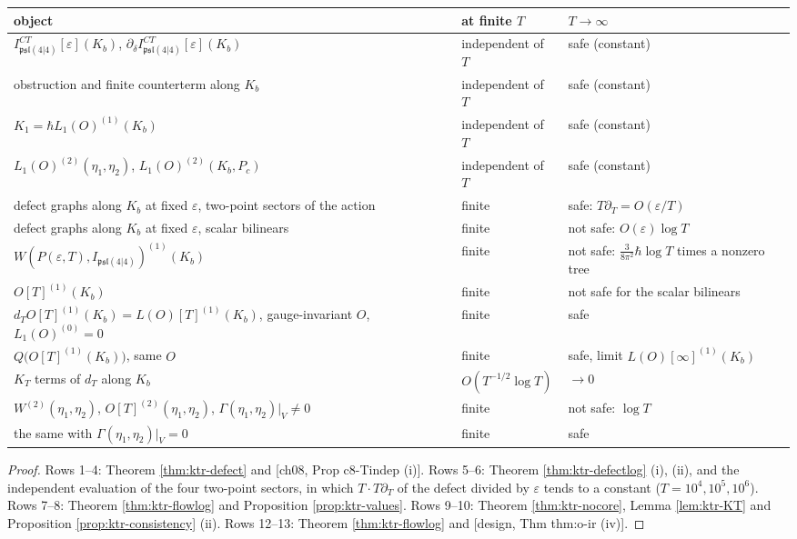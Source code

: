 \begin{proposition}
\label{prop:ktr-Tsafe}
\begin{center}
\begin{tabular}{l|l|l}
object & at finite $T$ & $T\to\infty$ \\
\hline
$I^{CT}_{\mathfrak{psl}(4|4)}[\varepsilon](K_b)$, $\partial_\delta I^{CT}_{\mathfrak{psl}(4|4)}[\varepsilon](K_b)$ & independent of $T$ & safe (constant) \\
obstruction and finite counterterm along $K_b$ & independent of $T$ & safe (constant) \\
$K_1=\hbar L_1(O)^{(1)}(K_b)$ & independent of $T$ & safe (constant) \\
$L_1(O)^{(2)}(\eta_1,\eta_2)$, $L_1(O)^{(2)}(K_b,P_c)$ & independent of $T$ & safe (constant) \\
defect graphs along $K_b$ at fixed $\varepsilon$, two-point sectors of the action & finite & safe: $T\partial_T=O(\varepsilon/T)$ \\
defect graphs along $K_b$ at fixed $\varepsilon$, scalar bilinears & finite & not safe: $O(\varepsilon)\log T$ \\
$W(P(\varepsilon,T),I_{\mathfrak{psl}(4|4)})^{(1)}(K_b)$ & finite & not safe: $\tfrac{3}{8\pi^2}\hbar\log T$ times a nonzero tree \\
$O[T]^{(1)}(K_b)$ & finite & not safe for the scalar bilinears \\
$d_TO[T]^{(1)}(K_b)=L(O)[T]^{(1)}(K_b)$, gauge-invariant $O$, $L_1(O)^{(0)}=0$ & finite & safe \\
$Q\big(O[T]^{(1)}(K_b)\big)$, same $O$ & finite & safe, limit $L(O)[\infty]^{(1)}(K_b)$ \\
$K_T$ terms of $d_T$ along $K_b$ & $O(T^{-1/2}\log T)$ & $\to0$ \\
$W^{(2)}(\eta_1,\eta_2)$, $O[T]^{(2)}(\eta_1,\eta_2)$, $\Gamma(\eta_1,\eta_2)|_V\neq0$ & finite & not safe: $\log T$ \\
the same with $\Gamma(\eta_1,\eta_2)|_V=0$ & finite & safe \\
\end{tabular}
\end{center}
\end{proposition}

\begin{proof}
Rows 1--4: Theorem \ref{thm:ktr-defect} and [ch08, Prop c8-Tindep (i)]. Rows 5--6: Theorem \ref{thm:ktr-defectlog} (i), (ii), and the independent evaluation of the four two-point sectors, in which $T\cdot T\partial_T$ of the defect divided by $\varepsilon$ tends to a constant ($T=10^4,10^5,10^6$). Rows 7--8: Theorem \ref{thm:ktr-flowlog} and Proposition \ref{prop:ktr-values}. Rows 9--10: Theorem \ref{thm:ktr-nocore}, Lemma \ref{lem:ktr-KT} and Proposition \ref{prop:ktr-consistency} (ii). Rows 12--13: Theorem \ref{thm:ktr-flowlog} and [design, Thm thm:o-ir (iv)].
\end{proof}

